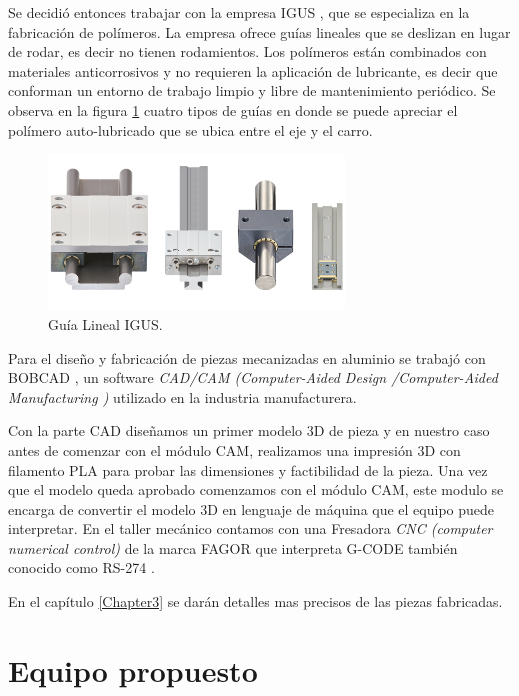 Se decidió entonces trabajar con la empresa IGUS \citep{web_igus}, que se especializa en la fabricación de polímeros. La empresa ofrece guías lineales que se deslizan en lugar de rodar, es decir no tienen rodamientos. Los polímeros están combinados con materiales anticorrosivos y no requieren la aplicación de lubricante, es decir que conforman un entorno de trabajo limpio y libre de mantenimiento periódico. Se observa en la figura \ref{fig:equipo_mecánico} cuatro tipos de guías en donde se puede apreciar el polímero auto-lubricado que se ubica entre el eje y el carro.

\begin{figure}[ht]
\centering 
\includegraphics[width=0.7\textwidth]{./Figures/guias.png}
\caption{Guía Lineal IGUS.}
\label{fig:equipo_mecánico}
\end{figure}

Para el diseño y fabricación de piezas mecanizadas en aluminio se trabajó con BOBCAD \citep{web_bobcad}, un software \textit{CAD/CAM (Computer-Aided Design /Computer-Aided Manufacturing )} utilizado en la industria manufacturera. 

Con la parte CAD diseñamos un primer modelo 3D de pieza y en nuestro caso antes de comenzar con el módulo CAM, realizamos  una impresión 3D con filamento PLA para probar las dimensiones y factibilidad de la pieza.
Una vez que el modelo queda aprobado comenzamos con el módulo CAM, este modulo se encarga de convertir el modelo 3D en lenguaje de máquina que el equipo puede interpretar. En el taller mecánico contamos con una Fresadora \textit{ CNC (computer numerical control)} de la marca FAGOR \citep{web_fagor} que interpreta G-CODE también conocido como RS-274 \citep{web_gcode}. 

En el capítulo \ref{Chapter3} se darán detalles mas precisos de las piezas fabricadas.
 

\section{Equipo propuesto}


